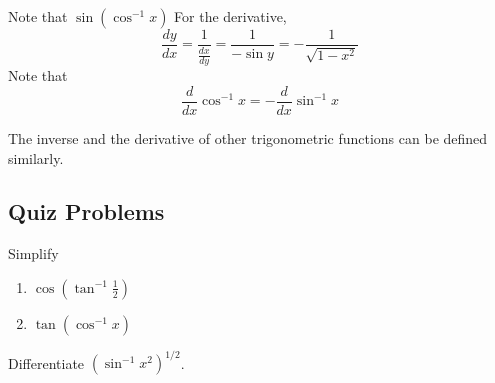 \documentclass[../main.tex]{subfiles}
\begin{document}
Note that $\sin(\cos^{-1} x) $
For the derivative,
\[
  \frac{dy}{dx} = \frac{1}{\frac{dx}{dy}} = \frac{1}{-\sin y} = -\frac{1}{\sqrt{1-x^2}}
\]
Note that
\[
  \frac{d}{dx} \cos^{-1}x = -\frac{d}{dx} \sin^{-1}x
\]

The inverse and the derivative of other trigonometric functions can be defined similarly.

\subsection*{Quiz Problems}
\begin{example}
  Simplify
  \begin{enumerate}
    \item $\cos(\tan^{-1} \frac{1}{2})$
    \item $\tan (\cos^{-1} x)$
  \end{enumerate}
\end{example}
\begin{example}
  Differentiate $(\sin^{-1} x^2)^{1/2}$.
\end{example}
\end{document}
